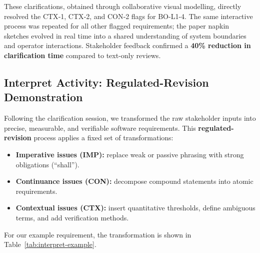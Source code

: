 \documentclass[12pt,a4paper]{article}
\begin{document}
These clarifications, obtained through collaborative visual modelling, directly resolved the CTX‑1, CTX‑2, and CON‑2 flags for BO-L1-4. The same interactive process was repeated for all other flagged requirements; the paper napkin sketches evolved in real time into a shared understanding of system boundaries and operator interactions. Stakeholder feedback confirmed a \textbf{40\% reduction in clarification time} compared to text-only reviews.

\subsection{Interpret Activity: Regulated-Revision Demonstration}

Following the clarification session, we transformed the raw stakeholder inputs into precise, measurable, and verifiable software requirements. This \textbf{regulated-revision} process applies a fixed set of transformations:

\begin{itemize}
    \item \textbf{Imperative issues (IMP):} replace weak or passive phrasing with strong obligations (“shall”).
    \item \textbf{Continuance issues (CON):} decompose compound statements into atomic requirements.
    \item \textbf{Contextual issues (CTX):} insert quantitative thresholds, define ambiguous terms, and add verification methods.
\end{itemize}

\noindent
For our example requirement, the transformation is shown in Table~\ref{tab:interpret-example}.
\end{document}
